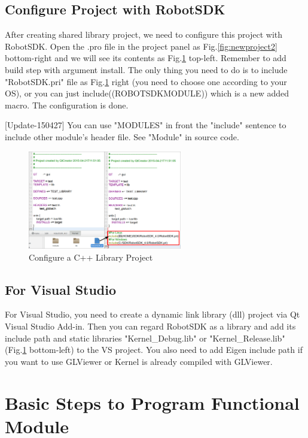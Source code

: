 \documentclass[a4paper,10pt]{book}
\begin{document}
\subsection{Configure Project with RobotSDK}

After creating shared library project, we need to configure this project with RobotSDK. Open the .pro file in the project panel as Fig.\ref{fig:newproject2} bottom-right and we will see its contents as Fig.\ref{fig:configproject1} top-left. Remember to add build step with argument install. The only thing you need to do is to include "RobotSDK.pri" file as Fig.\ref{fig:configproject1} right (you need to choose one according to your OS), or you can just include($$(ROBOTSDKMODULE)) which is a new added macro. The configuration is done.

[Update-150427] You can use "MODULES" in front the "include" sentence to include other module's header file. See "Module" in source code. 

\begin{figure}
 \centering
 \includegraphics[width=0.6\textwidth]{img/configproject1.eps}
 \caption{Configure a C++ Library Project}
 \label{fig:configproject1}
\end{figure}

\subsection{For Visual Studio}

For Visual Studio, you need to create a dynamic link library (dll) project via Qt Visual Studio Add-in. Then you can regard RobotSDK as a library and add its include path and static libraries "Kernel\_Debug.lib" or "Kernel\_Release.lib" (Fig.\ref{fig:configproject1} bottom-left) to the VS project. You also need to add Eigen include path if you want to use GLViewer or Kernel is already compiled with GLViewer.

\section{Basic Steps to Program Functional Module}
\end{document}
